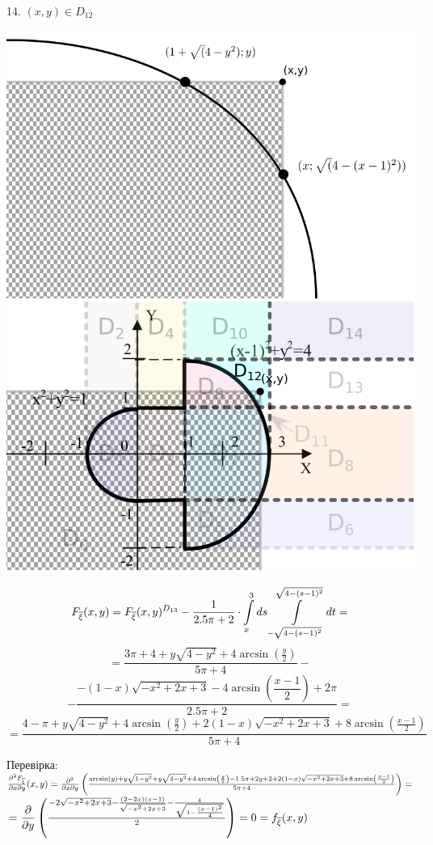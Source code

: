 \documentclass[14pt,a4paper]{scrartcl}
\theoremstyle{definition}
\theoremstyle{remark}
\theoremstyle{definition}
\theoremstyle{definition}
\begin{document}
14. $(x,y) \in D_{12}$
\begin{center} \includegraphics[scale=0.3]{assets/zones13111.png}\includegraphics[scale=0.27]{assets/zone14132.png} \end{center}
$$
F_{\overline{\xi}} (x,y) = F_{\overline{\xi}}(x,y)^{D_{13}} -  \frac{1}{2.5\pi + 2} \cdot
 \int\limits_{x}^{3}{ds  \int\limits_{-\sqrt{4 - (s-1)^2}}^{ \sqrt{4 - (s-1)^2}}{dt}} =
$$
$$
 = \dfrac{3\pi + 4 + y\sqrt{4-y^2}+4\arcsin\left(\frac{y}{2} \right)}{5\pi + 4} -
 $$
 $$- \frac{-\left(1-x\right)\sqrt{-x^2+2x+3}-4\arcsin\left(\dfrac{x-1}{2}\right)+2{\pi}}{2.5\pi + 2} =
$$
$$
= \frac{ 4-\pi + y\sqrt{4-y^2}+4\arcsin\left(\frac{y}{2} \right) +2\left(1-x\right)\sqrt{-x^2+2x+3}+8\arcsin\left(\frac{x-1}{2}\right) }{5\pi + 4}
$$


Перевірка:\\
$\frac{\partial^2 F_{\overline{\xi}}}{\partial x \partial y}(x,y) =
\frac{\partial^2}{\partial x \partial y} \left(  \frac{\arcsin\left(y\right)+y\sqrt{1-y^2}+  y  \sqrt{4-y^2}+4\arcsin\left(\frac{y}{2}\right)-  1.5\pi + 2y + 2 +2\left(1-x\right)\sqrt{-x^2+2x+3}+8\arcsin\left(\frac{x-1}{2}\right) }{5\pi + 4}
\right) =$\\
$ = \dfrac{\partial}{ \partial y} \left( \frac{-2\sqrt{-x^2+2x+3}-\frac{\left(2-2x\right)\left(x-1\right)}{\sqrt{-x^2+2x+3}}-\frac{4}{\sqrt{1-\frac{\left(x-1\right)^2}{4}}}}{2} \right)  = 0=f_{\overline{\xi}} (x,y)$\\
\end{document}
